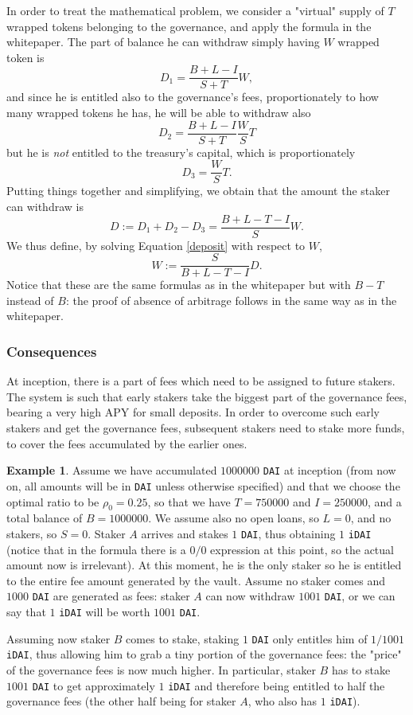 \documentclass[a4paper,10 pt]{article}
\theoremstyle{definition}
\newtheorem{example}{Example}
\begin{document}
In order to treat the mathematical problem, we consider a "virtual" supply of $T$ wrapped tokens belonging to the governance, and apply the formula in the whitepaper. The part of balance he can withdraw simply having $W$ wrapped token is $$D_1 = \frac{B + L - I}{S + T}W,$$ and since he is entitled also to the governance's fees, proportionately to how many wrapped tokens he has, he will be able to withdraw also $$D_2 =  \frac{B + L - I}{S + T}\frac{W}{S}T $$ but he is {\it not} entitled to the treasury's capital, which is proportionately $$D_3 = \frac{W}{S}T.$$ Putting things together and simplifying, we obtain that the amount the staker can withdraw is
\begin{equation}\label{deposit}D := D_1 + D_2 - D_3 = \frac{B+L-T-I}{S}W.\end{equation}
We thus define, by solving Equation \eqref{deposit} with respect to $W$,
\begin{equation}\label{wrappedTokens}W := \frac{S}{B+L-T-I}D.\end{equation}
Notice that these are the same formulas as in the whitepaper but with $B-T$ instead of $B$: the proof of absence of arbitrage follows in the same way as in the whitepaper.

\subsubsection{Consequences}
At inception, there is a part of fees which need to be assigned to future stakers. The system is such that early stakers take the biggest part of the governance fees, bearing a very high APY for small deposits. In order to overcome such early stakers and get the governance fees, subsequent stakers need to stake more funds, to cover the fees accumulated by the earlier ones.

\begin{example}
Assume we have accumulated $1000000$ \verb|DAI| at inception (from now on, all amounts will be in \verb|DAI| unless otherwise specified) and that we choose the optimal ratio to be $\rho_0 = 0.25$, so that we have $T = 750000$ and $I = 250000$, and a total balance of $B = 1000000$. We assume also no open loans, so $L = 0$, and no stakers, so $S = 0$.
Staker $A$ arrives and stakes $1$ \verb|DAI|, thus obtaining $1$ \verb|iDAI| (notice that in the formula there is a $0/0$ expression at this point, so the actual amount now is irrelevant). At this moment, he is the only staker so he is entitled to the entire fee amount generated by the vault. Assume no staker comes and $1000$ \verb|DAI| are generated as fees: staker $A$ can now withdraw $1001$ \verb|DAI|, or we can say that $1$ \verb|iDAI| will be worth $1001$ \verb|DAI|.

Assuming now staker $B$ comes to stake, staking $1$ \verb|DAI| only entitles him of $1/1001$ \verb|iDAI|, thus allowing him to grab a tiny portion of the governance fees: the "price" of the governance fees is now much higher. In particular, staker $B$ has to stake $1001$ \verb|DAI| to get approximately $1$ \verb|iDAI| and therefore being entitled to half the governance fees (the other half being for staker $A$, who also has $1$ \verb|iDAI|).
\end{example}
\end{document}
